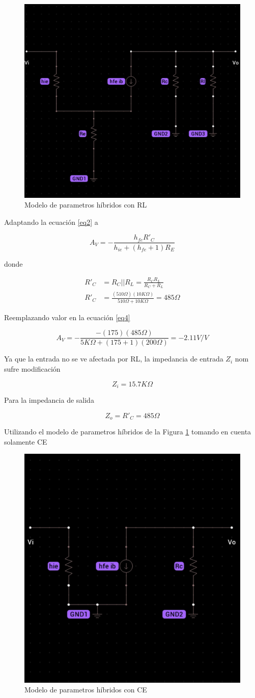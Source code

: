 \documentclass[12pt, a4paper]{article}
\begin{document}
    \begin{figure}[h!]
        \centering
        \includegraphics[height=4cm\textwidth]{h2.jpg} \par
        \caption{Modelo de parametros híbridos con RL}
        \label{fig:h2}
    \end{figure}

    Adaptando la ecuación \eqref{eq2} a

    \begin{equation}
        A_V = -\frac{h_{fe}R'_C}{h_{ie} + (h_{fe}+1)R_E}
        \label{eq4}
    \end{equation}

    donde
    
    \begin{equation*}
        \begin{split}
            R'_C & = R_C||R_L = \frac{R_CR_L}{R_C + R_L} \\
            R'_C & = \frac{(510\Omega)(10K\Omega)}{510\Omega + 10K\Omega} = 485\Omega
        \end{split}
    \end{equation*}   

    Reemplazando valor en la ecuación \eqref{eq4}

    $$A_V = -\frac{-(175)(485\Omega)}{5K\Omega + (175+1)(200\Omega)} = -2.11 V/V$$

    Ya que la entrada no se ve afectada por RL, la impedancia de entrada $Z_i$ nom sufre modificación

    $$Z_i = 15.7K\Omega$$

    Para la impedancia de salida

    $$Z_o = R'_C = 485\Omega$$

    Utilizando el modelo de parametros híbridos de la Figura \ref{fig:h2} tomando en cuenta solamente CE

    \begin{figure}[h!]
        \centering
        \includegraphics[height=4cm\textwidth]{h3.jpg} \par
        \caption{Modelo de parametros híbridos con CE}
        \label{fig:h3}
    \end{figure}
\end{document}
